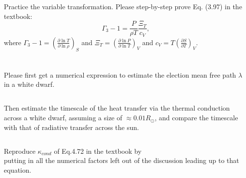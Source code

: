 \section{}
Practice the variable transformation. Please step-by-step prove Eq. (3.97) in the textbook:
\begin{equation*}
    \Gamma_3 -1 = \frac{P}{\rho T}\frac{\Xi_T}{c_V},
\end{equation*}
where $\Gamma_3 - 1 = \left(\frac{\partial\ln T}{\partial\ln\rho}\right)_S$ and $\Xi_T = \left(\frac{\partial\ln P}{\partial\ln T}\right)_V$ and $c_V = T\left(\frac{\partial S}{\partial T}\right)_V$.


\section{}
\subsection{}
Please first get a numerical expression to estimate the election mean free path $\lambda$ in a white dwarf.

\subsection{}
Then estimate the timescale of the heat transfer via the thermal conduction across a white dwarf, assuming a size of $\approx 0.01R_\odot$, and compare the timescale with that of radiative transfer across the sun. 

\subsection{}
Reproduce $\kappa_{cond}$ of Eq.4.72 in the textbook by \\putting in all the numerical factors left out of the discussion leading up to that equation.



